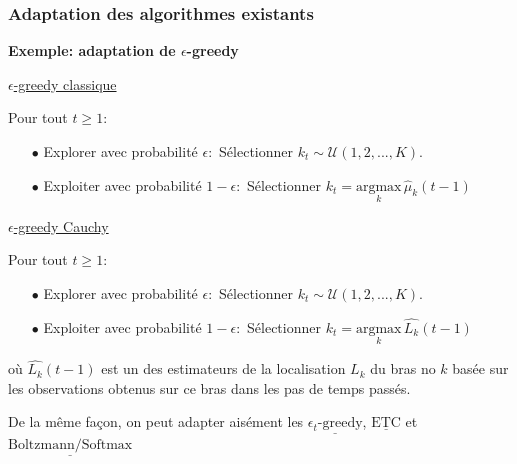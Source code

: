 \documentclass[8pt,sans,aspectratio=169]{beamer}
\begin{document}
\begin{frame}
\frametitle{Adaptation des algorithmes existants}
\pause

\textbf{Exemple: adaptation de $\epsilon$-greedy}

\vfill
\pause

\underline{$\epsilon$-greedy classique}\\

\vfill
\pause

Pour tout $t\geq 1:$

\begin{itemize}
\item[$\bullet$] Explorer avec probabilité $\epsilon:$ Sélectionner $k_t\sim\mathcal{U}({1,2,...,K}).$
\item[$\bullet$] Exploiter avec probabilité $1-\epsilon:$ Sélectionner $k_t=\underset{k}{\mathrm{argmax}}\, \hat{\mu}_k(t-1)$
\end{itemize}

\pause
\vfill

\underline{$\epsilon$-greedy Cauchy}

\pause
\vfill
Pour tout $t\geq 1:$

\begin{itemize}
\item[$\bullet$] Explorer avec probabilité $\epsilon:$ Sélectionner $k_t\sim\mathcal{U}({1,2,...,K}).$
\item[$\bullet$] Exploiter avec probabilité $1-\epsilon:$ Sélectionner $k_t=\underset{k}{\mathrm{argmax}}\, \widehat{L_k}(t-1)$
\end{itemize}

\vfill

où $\widehat{L_k}(t-1)$ est un des estimateurs de la localisation $L_k$ du bras no $k$ basée sur les observations obtenus sur ce bras dans les pas de temps passés.

\pause
\vfill

De la même façon, on peut adapter aisément les $\underline{\epsilon_t\text{-greedy}}$,
$\underline{\text{ETC}}$ et $\underline{\text{Boltzmann/Softmax}}$ 

\end{frame}
\end{document}
